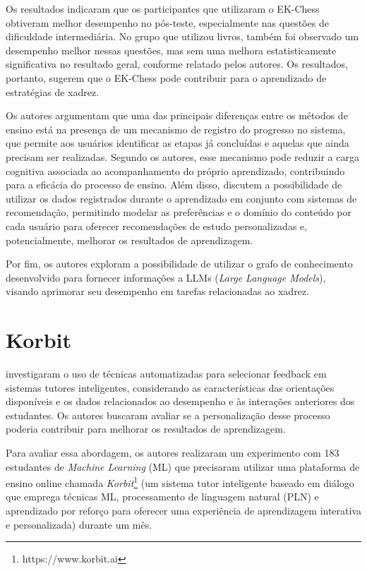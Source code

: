 Os resultados indicaram que os participantes que utilizaram o EK-Chess obtiveram melhor desempenho no pós-teste, especialmente nas questões de dificuldade intermediária. No grupo que utilizou livros, também foi observado um desempenho melhor nessas questões, mas sem uma melhora estatisticamente significativa no resultado geral, conforme relatado pelos autores. Os resultados, portanto, sugerem que o EK-Chess pode contribuir para o aprendizado de estratégias de xadrez.

Os autores argumentam que uma das principais diferenças entre os métodos de ensino está na presença de um mecanismo de registro do progresso no sistema, que permite aos usuários identificar as etapas já concluídas e aquelas que ainda precisam ser realizadas. Segundo os autores, esse mecanismo pode reduzir a carga cognitiva associada ao acompanhamento do próprio aprendizado, contribuindo para a eficácia do processo de ensino. Além disso, discutem a possibilidade de utilizar os dados registrados durante o aprendizado em conjunto com sistemas de recomendação, permitindo modelar as preferências e o domínio do conteúdo por cada usuário para oferecer recomendações de estudo personalizadas e, potencialmente, melhorar os resultados de aprendizagem.

Por fim, os autores exploram a possibilidade de utilizar o grafo de conhecimento desenvolvido para fornecer informações a LLMs (\textit{Large Language Models}), visando aprimorar seu desempenho em tarefas relacionadas ao xadrez.

\section{Korbit}
\cite{korbit-article} investigaram o uso de técnicas automatizadas para selecionar feedback em sistemas tutores inteligentes, considerando as características das orientações disponíveis e os dados relacionados ao desempenho e às interações anteriores dos estudantes. Os autores buscaram avaliar se a personalização desse processo poderia contribuir para melhorar os resultados de aprendizagem.

Para avaliar essa abordagem, os autores realizaram um experimento com 183 estudantes de \textit{Machine Learning} (ML) que precisaram utilizar uma plataforma de ensino online chamada \textit{Korbit}\footnote{https://www.korbit.ai} (um sistema tutor inteligente baseado em diálogo que emprega técnicas ML, processamento de linguagem natural (PLN) e aprendizado por reforço para oferecer uma experiência de aprendizagem interativa e personalizada) durante um mês.

